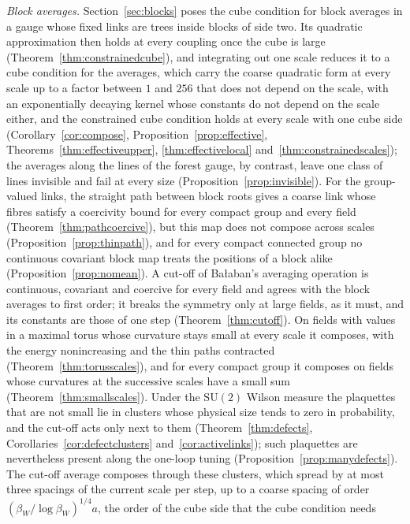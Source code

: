 \documentclass[11pt]{amsart}
\theoremstyle{definition}
\theoremstyle{remark}
\numberwithin{equation}{section}
\newcommand{\SU}{\mathrm{SU}}
\begin{document}
\emph{Block averages.} Section~\ref{sec:blocks} poses the cube condition for
block averages in a gauge whose fixed links are trees inside blocks of side
two. Its quadratic approximation then holds at every coupling once the cube
is large (Theorem~\ref{thm:constrainedcube}), and integrating out one scale
reduces it to a cube condition for the averages, which carry the coarse
quadratic form at every scale up to a factor between $1$ and $256$ that does
not depend on the scale, with an exponentially decaying kernel whose
constants do not depend on the scale either, and the constrained cube
condition holds at every scale with one cube side
(Corollary~\ref{cor:compose}, Proposition~\ref{prop:effective},
Theorems~\ref{thm:effectiveupper}, \ref{thm:effectivelocal}
and~\ref{thm:constrainedscales}); the averages along the lines of the forest
gauge, by contrast, leave one class of lines invisible and fail at every size
(Proposition~\ref{prop:invisible}). For the group-valued links, the straight
path between block roots gives a coarse link whose fibres satisfy a
coercivity bound for every compact group and every field
(Theorem~\ref{thm:pathcoercive}), but this map does not compose across
scales (Proposition~\ref{prop:thinpath}), and for every compact connected group no continuous
covariant block map treats the positions of a block alike
(Proposition~\ref{prop:nomean}). A cut-off of Ba{\l}aban's averaging
operation is continuous, covariant and coercive for every field and agrees
with the block averages to first order; it breaks the symmetry only at large
fields, as it must, and its constants are those of one step
(Theorem~\ref{thm:cutoff}). On fields with values in a maximal torus whose
curvature stays small at every scale it composes, with the energy
nonincreasing and the thin paths contracted (Theorem~\ref{thm:torusscales}), and for every compact group it composes
on fields whose curvatures at the successive scales have a small sum
(Theorem~\ref{thm:smallscales}). Under the $\SU(2)$ Wilson measure the
plaquettes that are not small lie in clusters whose physical size tends to
zero in probability, and the cut-off acts only next to them
(Theorem~\ref{thm:defects}, Corollaries~\ref{cor:defectclusters}
and~\ref{cor:activelinks}); such plaquettes are nevertheless present along
the one-loop tuning (Proposition~\ref{prop:manydefects}). The cut-off
average composes through these clusters, which spread by at most three
spacings of the current scale per step, up to a coarse spacing of order
$(\beta_W/\log\beta_W)^{1/4}a$, the order of the cube side that the cube condition
needs
\end{document}
